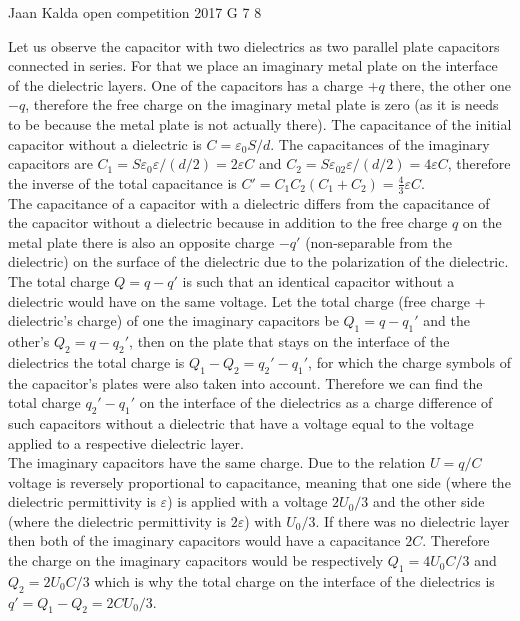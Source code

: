 \documentclass[11pt]{article}
\begin{document}
{Jaan Kalda} %
{open competition} %
{2017} %
{G 7} %
{8} %
{

\ifEngSolution
Let us observe the capacitor with two dielectrics as two parallel plate capacitors connected in series. For that we place an imaginary metal plate on the interface of the dielectric layers. One of the capacitors has a charge $+q$ there, the other one $-q$, therefore the free charge on the imaginary metal plate is zero (as it is needs to be because the metal plate is not actually there). The capacitance of the initial capacitor without a dielectric is $C=\varepsilon_0S/d$. The capacitances of the imaginary capacitors are $C_1=S\varepsilon_0\varepsilon/(d/2)=2\varepsilon C$ and $C_2=S\varepsilon_02\varepsilon/(d/2)=4\varepsilon C$, therefore the inverse of the total capacitance is $C'=C_1C_2(C_1+C_2)=\frac 43\varepsilon C$. \\
The capacitance of a capacitor with a dielectric differs from the capacitance of the capacitor without a dielectric because in addition to the free charge $q$ on the metal plate there is also an opposite charge $-q'$ (non-separable from the dielectric) on the surface of the dielectric due to the polarization of the dielectric. The total charge $Q=q-q'$ is such that an identical capacitor without a dielectric would have on the same voltage. Let the total charge (free charge + dielectric’s charge) of one the imaginary capacitors be $Q_1=q-q_1'$ and the other’s $Q_2=q-q_2'$, then on the plate that stays on the interface of the dielectrics the total charge is $Q_1-Q_2=q_2'-q_1'$, for which the charge symbols of the capacitor’s plates were also taken into account. Therefore we can find the total charge $q_2'-q_1'$ on the interface of the dielectrics as a charge difference of such capacitors without a dielectric that have a voltage equal to the voltage applied to a respective dielectric layer.\\
The imaginary capacitors have the same charge. Due to the relation $U=q/C$ voltage is reversely proportional to capacitance, meaning that one side (where the dielectric permittivity is $\varepsilon$) is applied with a voltage $2U_0/3$ and the other side (where the dielectric permittivity is $2\varepsilon$) with $U_0/3$. If there was no dielectric layer then both of the imaginary capacitors would have a capacitance $2C$. Therefore the charge on the imaginary capacitors would be respectively $Q_1=4U_0C/3$ and $Q_2=2U_0C/3$ which is why the total charge on the interface of the dielectrics is $q'=Q_1-Q_2=2CU_0/3$.\\

}
\end{document}
